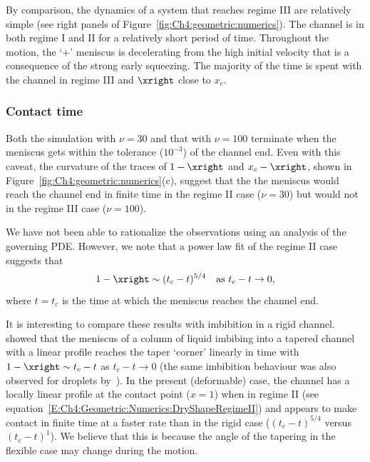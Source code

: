 By comparison, the dynamics of a system that reaches regime III are relatively simple (see right panels of Figure~\ref{fig:Ch4:geometric:numerics}).   The channel is in both regime I and II for a relatively short period of time. Throughout the motion, the `$+$' meniscus is decelerating from the high initial velocity that is a consequence of the strong early squeezing. The majority of the time is spent with the channel in regime III and $\xright$ close to $x_c$.

\subsubsection{Contact time}
Both the simulation with $\nu = 30$  and that with $\nu = 100$ terminate when the meniscus gets within the tolerance ($10^{-3}$) of the channel end. Even with this caveat,  the curvature of the traces of $1 - \xright$ and $x_c - \xright$, shown in Figure~\ref{fig:Ch4:geometric:numerics}(c), suggest that the the meniscus would reach the channel end in finite time in the regime II case ($\nu = 30$) but would not in the regime III case ($\nu = 100$).

We have not been able to rationalize the observations using an analysis of the governing PDE. However, we note that a power law fit of the regime II case suggests that
\begin{equation}\label{E:Ch4:Geometric:numerics:contact_time}
1 - \xright \sim (t_c - t)^{5/4} \quad \text{as}~t_c - t \to 0,
\end{equation}
where $t = t_c$ is the time at which the meniscus reaches the channel end.

It is interesting to compare these results with imbibition in a rigid channel. \cite{Gorce2016Langmuir} showed that the meniscus of a column of liquid imbibing into a tapered channel with a linear profile reaches the taper `corner' linearly in time with $1 - \xright \sim t_c - t$ as $ t_c - t \to 0$ (the same imbibition behaviour was also observed for droplets by~\cite{Reyssat2014JFM}). In the present (deformable) case, the channel has a locally linear profile at the contact point ($x = 1$) when in regime II (see equation~\eqref{E:Ch4:Geometric:Numerics:DryShapeRegimeII}) and appears to make contact in finite time at a faster rate than in the rigid case ($(t_c - t)^{5/4}$ versus $(t_c - t)^1$). We believe that this is because the angle of the tapering in the flexible case may change during the motion.

